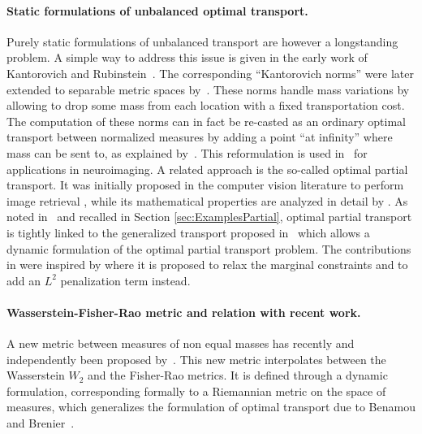 \paragraph{Static formulations of unbalanced optimal transport. }
Purely static formulations of unbalanced transport are however a longstanding problem. 
%
A simple way to address this issue is given in the early work of Kantorovich and Rubinstein~\cite{kantorovich1958space}. The corresponding ``Kantorovich norms'' were later extended to separable metric spaces by~\cite{hanin1999extension}. These norms handle mass variations by allowing to drop some mass from each location with a fixed transportation cost. 
%
The computation of these norms can in fact be re-casted as an ordinary optimal transport between normalized measures by adding a point ``at infinity'' where mass can be sent to, as explained by~\cite{guittet2002extended}. This reformulation is used in~\cite{GramfortMICCAI} for applications in neuroimaging. 
%
A related approach is the so-called optimal partial transport. It was initially proposed in the computer vision literature to perform image retrieval \cite{rubner1997earth,pele2008linear}, while its mathematical properties are analyzed in detail by \cite{caffarelli2010free,figalli2010optimal}. 
%
As noted in~\cite{ChizatOTFR2015} and recalled in Section \ref{sec:ExamplesPartial}, optimal partial transport is tightly linked to the generalized transport proposed in~\cite{piccoli2014generalized,piccoli2013properties} which allows a dynamic formulation of the optimal partial transport problem.
%
The contributions in \cite{piccoli2014generalized} were inspired by \cite{benamou2003numerical} where it is proposed to relax the marginal constraints and to add an $L^2$ penalization term instead.
%
\paragraph{Wasserstein-Fisher-Rao metric and relation with recent work.}

A new metric between measures of non equal masses has recently and independently been proposed by~\cite{ChizatOTFR2015,new2015kondratyev}. This new metric interpolates between the Wasserstein $W_2$ and the Fisher-Rao metrics. It is defined through a dynamic formulation, corresponding formally to a Riemannian metric on the space of measures, which generalizes the formulation of optimal transport due to Benamou and Brenier~\cite{benamou2000computational}. 

